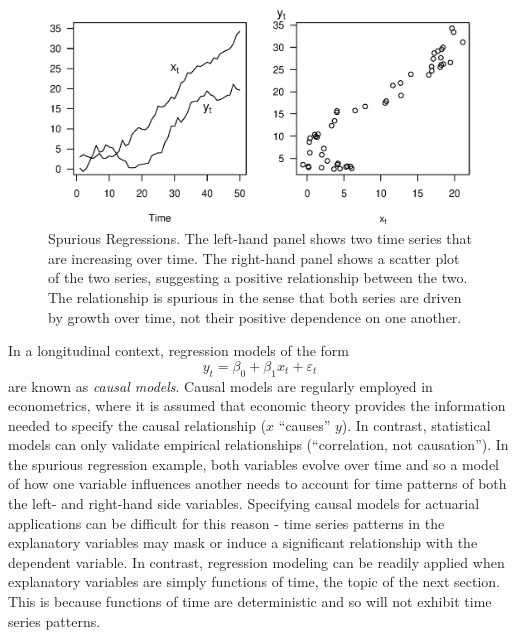 \begin{figure}[htp]
  \begin{center}
    \includegraphics[width=1\textwidth]{Chapter7Trend/Figure71SpurCorr.eps}
    \caption{\label{F7:SpurCorr} \small Spurious
Regressions. The left-hand panel shows two time series that are
increasing over time. The right-hand panel shows a scatter plot of
the two series, suggesting a positive relationship between the two.
The relationship is spurious in the sense that both series are
driven by growth over time, not their positive dependence on one
another.}
  \end{center}
\end{figure}

\linejed

In a longitudinal context, regression models of the form%
\begin{equation*}
y_t = \beta_0 + \beta_1 x_t + \varepsilon_t
\end{equation*}
are known as \emph{causal models}. Causal models are regularly
employed in econometrics, where it is assumed that economic theory
provides the information needed to specify the causal relationship
($x$ ``causes'' $y$). In contrast, statistical models can only
validate empirical relationships (``correlation, not causation'').
In the spurious regression example, both variables evolve over time
and so a model of how one variable influences another needs to
account for time patterns of both the left- and right-hand side
variables. Specifying causal models for actuarial applications can
be difficult for this reason - time series patterns in the
explanatory variables may mask or induce a significant relationship
with the dependent variable. In contrast, regression modeling can be
readily applied when explanatory variables are simply functions of
time, the topic of the next section. This is because functions of
time are deterministic and so will not exhibit time series patterns.

